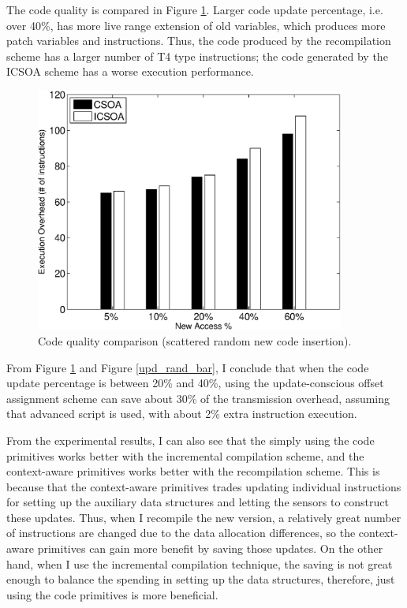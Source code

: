 The code quality is compared in Figure \ref{exe_rand_bar}. Larger code update percentage, i.e. over 40\%, has more live range extension of old variables, which produces more patch variables and instructions. Thus, the code produced by the recompilation scheme has a larger number of T4 type instructions; the code generated by the ICSOA scheme has a worse execution performance. 


\begin{figure}[htbp]
\begin{center}
\includegraphics[width=4in]{./figures/exe_rand_bar.eps}
\caption{Code quality comparison (scattered random new code insertion).}
\label{exe_rand_bar}
\end{center}
\vspace{-0.2in}
\end{figure}


From Figure \ref{exe_rand_bar} and Figure \ref{upd_rand_bar}, I conclude that when the code update percentage is between 20\% and 40\%, using the update-conscious offset assignment scheme can save about 30\% of the transmission overhead, assuming that advanced script is used, with about 2\% extra instruction execution.


From the experimental results, I can also see that the simply using the code primitives works better with the incremental compilation scheme, and the context-aware primitives works better with the recompilation scheme.
This is because that the context-aware primitives trades updating individual instructions for setting up the auxiliary data structures and letting the sensors to construct these updates.
Thus, when I recompile the new version, a relatively great number of instructions are changed due to the data allocation differences, so the  context-aware primitives can gain more benefit by saving those updates. 
On the other hand, when I use the incremental compilation technique, the saving is not great enough to balance the spending in setting up the data structures, therefore, just using the code primitives is more beneficial. 



